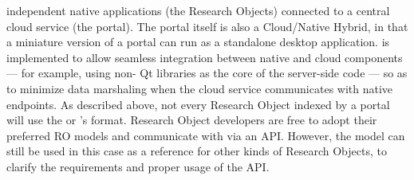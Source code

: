 \documentclass[10pt,letterpaper]{article}
\begin{document}
independent native applications (the {\RAK} 
Research Objects) connected to a central 
cloud service (the {\MOSAIC} portal).  The portal 
itself is also a Cloud/Native Hybrid, in that a 
miniature version of a {\MOSAIC} portal can run 
as a standalone desktop application.  {\lfMOSAIC} 
is implemented to allow seamless integration between 
native and cloud components --- for example, 
using non-{\GUI} Qt libraries as the core of the 
server-side code --- so as to minimize data 
marshaling when the cloud service 
communicates with native endpoints.
\p{}
As described above, not every Research Object indexed 
by a {\MOSAIC} portal will use the {\MOSAIC} {\SDK} or 
{\MOSAIC}'s {\RAK} format.  Research Object developers are 
free to adopt their preferred RO models and 
communicate with {\MOSAIC} via an API.  However, 
the {\RAK} model can still be used in this case as a 
reference for other kinds of Research Objects, 
to clarify the requirements and 
proper usage of the {\MOSAIC} API.
\p{}
\end{document}
